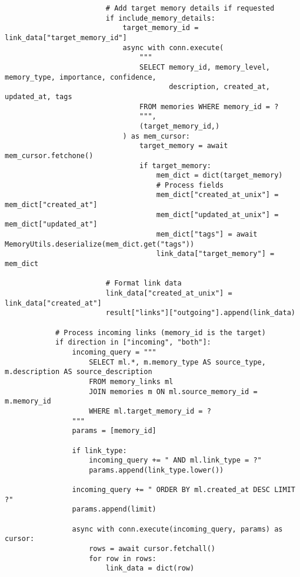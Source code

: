 \documentclass[12pt,a4paper]{article}
\begin{document}
\begin{pageablecode}
\begin{verbatim}
                        # Add target memory details if requested
                        if include_memory_details:
                            target_memory_id = link_data["target_memory_id"]
                            async with conn.execute(
                                """
                                SELECT memory_id, memory_level, memory_type, importance, confidence, 
                                       description, created_at, updated_at, tags
                                FROM memories WHERE memory_id = ?
                                """, 
                                (target_memory_id,)
                            ) as mem_cursor:
                                target_memory = await mem_cursor.fetchone()
                                if target_memory:
                                    mem_dict = dict(target_memory)
                                    # Process fields
                                    mem_dict["created_at_unix"] = mem_dict["created_at"]
                                    mem_dict["updated_at_unix"] = mem_dict["updated_at"]
                                    mem_dict["tags"] = await MemoryUtils.deserialize(mem_dict.get("tags"))
                                    link_data["target_memory"] = mem_dict
                        
                        # Format link data
                        link_data["created_at_unix"] = link_data["created_at"]
                        result["links"]["outgoing"].append(link_data)
            
            # Process incoming links (memory_id is the target)
            if direction in ["incoming", "both"]:
                incoming_query = """
                    SELECT ml.*, m.memory_type AS source_type, m.description AS source_description
                    FROM memory_links ml
                    JOIN memories m ON ml.source_memory_id = m.memory_id
                    WHERE ml.target_memory_id = ?
                """
                params = [memory_id]
                
                if link_type:
                    incoming_query += " AND ml.link_type = ?"
                    params.append(link_type.lower())
                
                incoming_query += " ORDER BY ml.created_at DESC LIMIT ?"
                params.append(limit)
                
                async with conn.execute(incoming_query, params) as cursor:
                    rows = await cursor.fetchall()
                    for row in rows:
                        link_data = dict(row)
                        

\end{verbatim}
\end{pageablecode}
\end{document}

